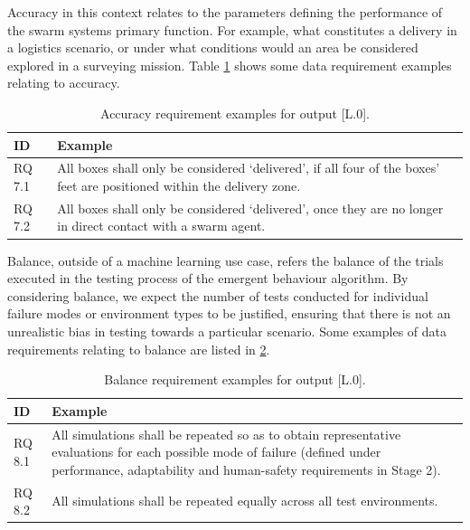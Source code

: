 \documentclass[lettersize,journal]{IEEEtran}
\begin{document}
Accuracy in this context relates to the parameters defining the performance of the swarm systems primary function. For example, what constitutes a delivery in a logistics scenario, or under what conditions would an area be considered explored in a surveying mission. Table \ref{tab:L0_accuracy} shows some data requirement examples relating to accuracy.

\begin{table}[h]
    \centering
    \begin{tabular}{p{1cm} p{6cm}}
        \textbf{ID} & \textbf{Example} \\
        \hline
        RQ 7.1 & All boxes shall only be considered ‘delivered’, if all four of the boxes’ feet are positioned within the delivery zone.\\
        \hline
        RQ 7.2 & All boxes shall only be considered ‘delivered’, once they are no longer in direct contact with a swarm agent.\\
    \end{tabular}
    \caption{Accuracy requirement examples for output [L.0].}
    \label{tab:L0_accuracy}
\end{table}

Balance, outside of a machine learning use case, refers the balance of the trials executed in the testing process of the emergent behaviour algorithm. By considering balance, we expect the number of tests conducted for individual failure modes or environment types to be justified, ensuring that there is not an unrealistic bias in testing towards a particular scenario. Some examples of data requirements relating to balance are listed in \ref{tab:L0_balance}.

\begin{table}[h]
    \centering
    \begin{tabular}{p{1cm} p{6cm}}
        \textbf{ID} & \textbf{Example} \\
        \hline
        RQ 8.1 & All simulations shall be repeated so as to obtain representative evaluations for each possible mode of failure (defined under performance, adaptability and human-safety requirements in Stage 2).\\
        \hline
        RQ 8.2 & All simulations shall be repeated equally across all test environments.\\
        \hline
    \end{tabular}
    \caption{Balance requirement examples for output [L.0].}
    \label{tab:L0_balance}
\end{table}
\end{document}
